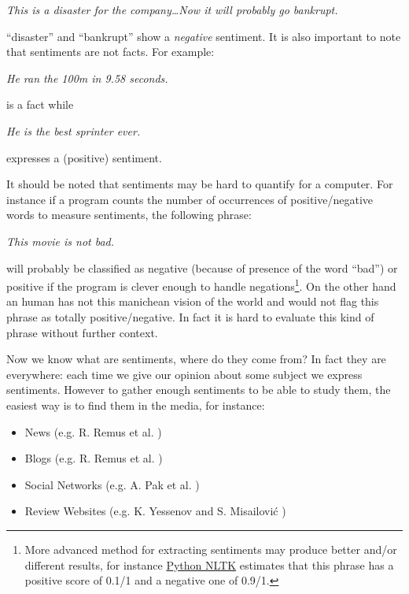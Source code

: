 \documentclass[12pt]{report}
\begin{document}
\begin{center}
	\emph{This is a {\color{red}disaster} for the company\ldots Now it will probably go {\color{red}bankrupt}.}
\end{center}

``{\color{red}disaster}'' and ``{\color{red}bankrupt}'' show a \emph{negative} sentiment. It is also important to note that sentiments are not facts\cite{wright09}. For example:

\begin{center}
	\emph{He ran the 100m in 9.58 seconds.}
\end{center} is a fact while

\begin{center}
	\emph{He is the best sprinter ever.}
\end{center}

expresses a (positive) sentiment.

It should be noted that sentiments may be hard to quantify for a computer. For instance if a program counts the number of occurrences of positive/negative words to measure sentiments, the following phrase:

\begin{center}
	\emph{This movie is not bad.}
\end{center}

will probably be classified as negative (because of presence of the word ``bad'') or positive if the program is clever enough to handle negations\footnote{More advanced method for extracting sentiments may produce better and/or different results, for instance \href{http://text-processing.com/demo/sentiment/}{Python NLTK} estimates that this phrase has a positive score of 0.1/1 and a negative one of 0.9/1.}. On the other hand an human has not this manichean vision of the world and would not flag this phrase as totally positive/negative. In fact it is hard to evaluate this kind of phrase without further context.

Now we know what are sentiments, where do they come from? In fact they are everywhere: each time we give our opinion about some subject we express sentiments. However to gather enough sentiments to be able to study them, the easiest way is to find them in the media, for instance:
\begin{itemize}
	\item News (e.g. R. Remus et al. \cite{remus09})
	\item Blogs (e.g. R. Remus et al. \cite{remus09})
	\item Social Networks (e.g. A. Pak et al. \cite{pak10})
	\item Review Websites (e.g. K. Yessenov and S. Misailovi\'c \cite{yessenov09})
\end{itemize}
\end{document}
